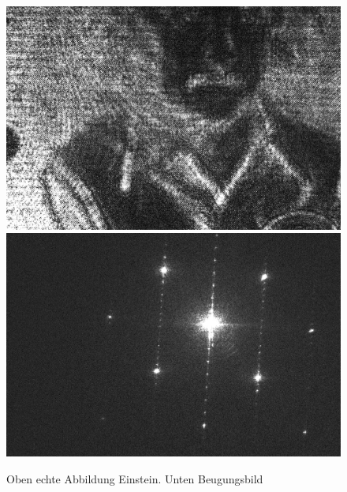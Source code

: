 \begin{figure}[h]
	\centering
	\includegraphics[width=\textwidth]{Daten/einstein_1.jpg}
	\includegraphics[width=\textwidth]{Daten/einstein_2.jpg}
	\caption[Aufnahme Einstein]{Oben echte Abbildung Einstein. Unten Beugungsbild}
\end{figure}

